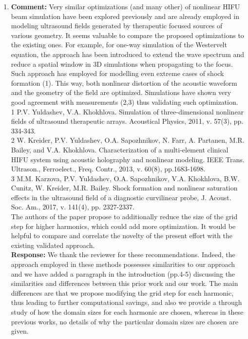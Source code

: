 \documentclass[11pt]{article}
\begin{document}
\begin{enumerate}
	\item \textbf{Comment:} Very similar optimizations (and many other) of nonlinear HIFU beam simulation have been explored previously and are already employed in modeling ultrasound fields generated by therapeutic focused sources of various geometry. It seems valuable to compare the proposed optimizations to the existing ones.
	For example, for one-way simulation of the Westervelt equation, the approach has been introduced to extend the wave spectrum and reduce a spatial window in 3D simulations when propagating to the focus. Such approach has employed for modelling even extreme cases of shock formation (1). This way, both nonlinear distortion of the acoustic waveform and the geometry of the field are optimized. Simulations have shown very good agreement with measurements (2,3) thus validating such optimization. \\
	1 P.V. Yuldashev, V.A. Khokhlova. Simulation of three-dimensional nonlinear fields of ultrasound therapeutic arrays. Acoustical Physics, 2011, v. 57(3), pp. 334-343.\\
	2 W. Kreider, P.V. Yuldashev, O.A. Sapozhnikov, N. Farr, A. Partanen, M.R. Bailey, and V.A. Khokhlova. Characterization of a multi-element clinical HIFU system using acoustic holography and nonlinear modeling. IEEE Trans. Ultrason., Ferroelect., Freq. Contr., 2013, v. 60(8), pp.1683-1698.\\
	3 M.M. Karzova, P.V. Yuldashev, O.A. Sapozhnikov, V.A. Khokhlova, B.W. Cunitz, W. Kreider, M.R. Bailey. Shock formation and nonlinear saturation effects in the ultrasound field of a diagnostic curvilinear probe, J. Acoust. Soc. Am., 2017, v. 141(4), pp. 2327-2337.\\
	The authors of the paper propose to additionally reduce the size of the grid step for higher harmonics, which could add more optimization. It would be helpful to compare and correlate the novelty of the present effort with the existing validated approach.  \\
	\textbf{Response:} We thank the reviewer for these recommendations. Indeed, the approach employed in these methods 
	possesses similarities to our approach and we have added a paragraph in the introduction (pp.4-5) discussing the 
	similarities and differences between this prior work and our work. The main differences are that 
	we propose modifying the grid step for each harmonic, thus leading to further computational savings, and 
	also we provide a through study of how the domain sizes for each harmonic are chosen, whereas in 
	these previous works, no details of why the particular domain sizes are chosen are given.


\end{enumerate}
\end{document}

